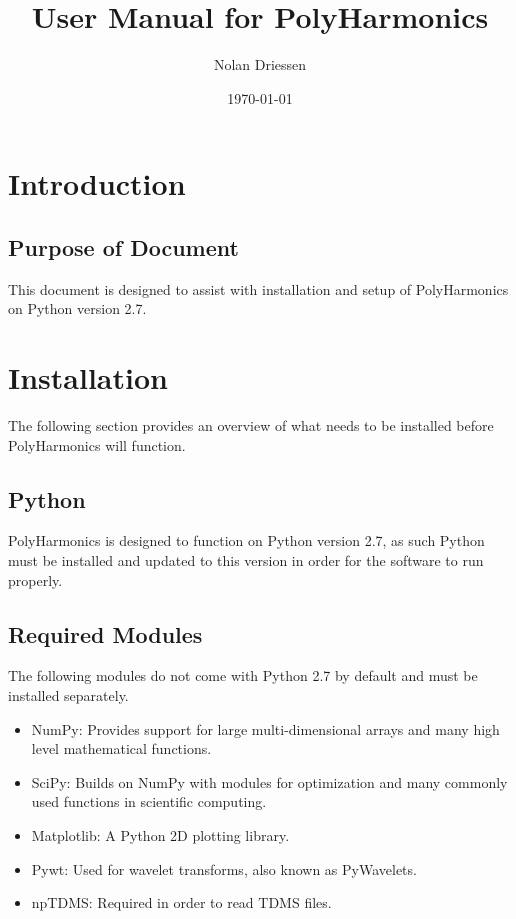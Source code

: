 \documentclass[12pt]{article}
\newcommand{\progname}{PolyHarmonics}
\begin{document}
\title{User Manual for \progname} 
\author{Nolan Driessen}
\date{\today}
	
\maketitle

\tableofcontents

\section{Introduction}

\subsection{Purpose of Document}

This document is designed to assist with installation and setup of \progname{} 
on Python version 2.7.


\section{Installation}
The following section provides an overview of what needs to be installed before 
\progname{} will function.

\subsection{Python}
\progname{} is designed to function on Python version 2.7, as such Python must 
be installed and updated to this version in order for the software to run 
properly.
\subsection{Required Modules}
The following modules do not come with Python 2.7 by default and must be 
installed separately.
\begin{itemize}
\item NumPy: Provides support for large multi-dimensional arrays and many high 
level mathematical functions.
\item SciPy: Builds on NumPy with modules for optimization and many commonly 
used functions in scientific computing.
\item Matplotlib: A Python 2D plotting library.
\item Pywt: Used for wavelet transforms, also known as PyWavelets.
\item npTDMS: Required in order to read TDMS files.
\end{itemize}
\end{document}
